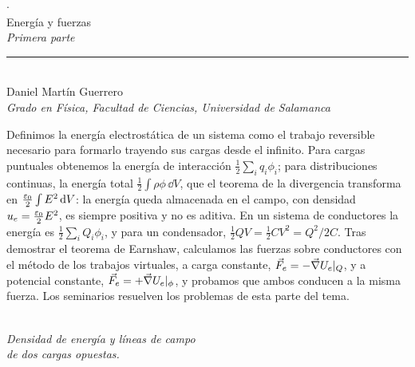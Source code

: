\hacerportada

\thispagestyle{empty}
\begin{center}
  {\small\color{tenue}\quad$\cdot$\quad{}}\\[1.6em]
  {\fuentetitulo\fontsize{21}{25}\selectfont Energía y fuerzas}\\[0.4em]
  {\large\itshape Primera parte}\\[0.9em]
  {\color{acentoA}\rule{2.6cm}{0.6pt}}\\[1.1em]
  {\large Daniel Martín Guerrero}\\[0.3em]
  {\small\itshape\color{tenue} Grado en Física, Facultad de Ciencias, Universidad de Salamanca}
\end{center}
\vspace{1.6em}

\noindent
\begin{minipage}[t]{0.6\textwidth}
\small
{\color{acentoA}}\enspace
Definimos la energía electrostática de un sistema como el trabajo reversible necesario para formarlo trayendo
sus cargas desde el infinito. Para cargas puntuales obtenemos la energía de interacción
$\frac12\sum_iq_i\phi_i$; para distribuciones continuas, la energía total $\frac12\int\rho\phi\,\dd V$, que el teorema de la
divergencia transforma en $\frac{\varepsilon_0}{2}\int E^2\mathop{}\!\mathrm{d} V$: la energía queda almacenada en el campo, con densidad
$u_e=\frac{\varepsilon_0}{2}E^2$, es siempre positiva y no es aditiva. En un sistema de conductores la energía es
$\frac12\sum_iQ_i\phi_i$, y para un condensador, $\frac12QV=\frac12CV^2=Q^2/2C$. Tras demostrar el teorema de Earnshaw,
calculamos las fuerzas sobre conductores con el método de los trabajos virtuales, a carga constante,
$\vec F_e=-\vec\nabla U_e|_Q$, y a potencial constante, $\vec F_e=+\vec\nabla U_e|_\phi$, y probamos que ambos conducen a la misma
fuerza. Los seminarios resuelven los problemas de esta parte del tema.
\end{minipage}\hfill
\begin{minipage}[t]{0.36\textwidth}\centering\vspace{-0.6em}
\\[-0.1em]
{\scriptsize\color{tenue}\itshape Densidad de energía y líneas de campo\\ de dos cargas opuestas.}
\end{minipage}

